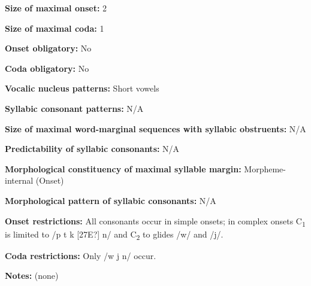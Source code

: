 \begin{styleBody}
\textbf{Size of maximal onset:} 2
\end{styleBody}

\begin{styleBody}
\textbf{Size of maximal coda:} 1
\end{styleBody}

\begin{styleBody}
\textbf{Onset obligatory:} No
\end{styleBody}

\begin{styleBody}
\textbf{Coda obligatory:} No
\end{styleBody}

\begin{styleBody}
\textbf{Vocalic nucleus patterns:} Short vowels
\end{styleBody}

\begin{styleBody}
\textbf{Syllabic consonant patterns:} N/A
\end{styleBody}

\begin{styleBody}
\textbf{Size of maximal word{}-marginal sequences with syllabic obstruents:} N/A
\end{styleBody}

\begin{styleBody}
\textbf{Predictability of syllabic consonants:} N/A
\end{styleBody}

\begin{styleBody}
\textbf{Morphological constituency of maximal syllable margin:} Morpheme-internal (Onset)
\end{styleBody}

\begin{styleBody}
\textbf{Morphological pattern of syllabic consonants:} N/A
\end{styleBody}

\begin{styleBody}
\textbf{Onset restrictions:} All consonants occur in simple onsets; in complex onsets C\textsubscript{1} is limited to /p t k [27E?] n/ and C\textsubscript{2} to glides /w/ and /j/.
\end{styleBody}

\begin{styleBody}
\textbf{Coda restrictions:} Only /w j n/ occur.
\end{styleBody}

\begin{styleBody}
\textbf{Notes: }(none)
\end{styleBody}

